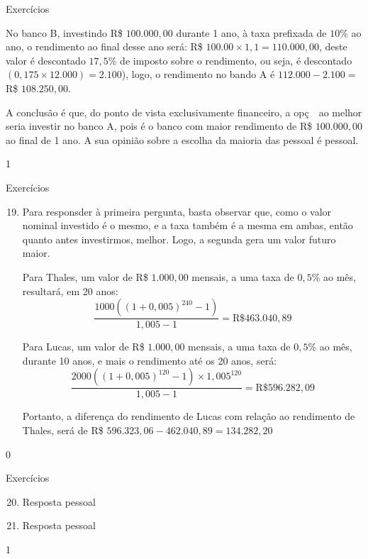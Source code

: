 \begin{answer}{Exercícios}
{\begin{enumerate}
    No banco B, investindo R\$ $100.000{,}00$ durante 1 ano, à taxa prefixada de $10$\% ao ano, o rendimento ao final desse ano será: R\$ $100.00\times1{,}1=110.000{,}00$, deste valor é descontado $17{,}5$\% de imposto sobre o rendimento, ou seja, é descontado $(0{,}175\times12.000)=2.100$), logo, o rendimento no bando A é $112.000-2.100=$R\$ $108.250{,}00$.

    A conclusão é que, do ponto de vista exclusivamente financeiro, a opç~~ao melhor seria investir no banco A, pois é o banco com maior rendimento de R\$ $100.000{,}00$ ao final de 1 ano. A sua opinião sobre a escolha da maioria das pessoal é pessoal.
  \end{enumerate}
}{1}
\end{answer}
\begin{answer}{Exercícios}
{\exerciselist
{}
  \begin{enumerate}\setcounter{enumi}{18}
    \item Para responsder à primeira pergunta, basta observar que, como o valor nominal investido é o mesmo, e a taxa também é a mesma em ambas, então quanto antes investirmos, melhor. Logo, a segunda gera um valor futuro maior.

    Para Thales, um valor de R\$ $1.000,00$ mensais, a uma taxa de $0{,}5$\% ao mês, resultará, em 20 anos:
    \begin{equation*}
    \frac{1000((1+0{,}005)^{240}-1)}{1{,}005-1}=\text{R\$ }463.040{,}89
    \end{equation*}

    Para Lucas, um valor de R\$ $1.000,00$ mensais, a uma taxa de $0{,}5$\% ao mês, durante 10 anos, e mais o rendimento até os 20 anos, será:
    \begin{equation*}
    \frac{2000((1+0{,}005)^{120}-1)\times1{,}005^{120}}{1{,}005-1}=\text{R\$ }596.282{,}09
    \end{equation*}

    Portanto, a diferença do rendimento de Lucas com relação ao rendimento de Thales, será de R\$ $596.323{,}06-462.040{,}89=134.282{,}20$
    \end{enumerate}
}{0}
\end{answer}
\clearmargin
\begin{answer}{Exercícios}
{\exerciselist

  \begin{enumerate}\setcounter{enumi}{19}
    \item Resposta pessoal
    \item Resposta pessoal
  \end{enumerate}
}{1}
\end{answer}
